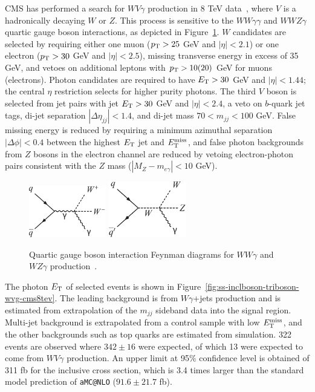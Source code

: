 CMS has performed a search for $WV\gamma$ production in 8 TeV
data~\cite{Chatrchyan:2014bza}, where $V$ is a hadronically decaying
$W$ or $Z$.  This process is sensitive to the $WW\gamma\gamma$ and
$WWZ\gamma$ quartic gauge boson interactions, as depicted in
Figure~\ref{fig:ss-inclboson-triboson-wvg-diagrams}.  $W$ candidates are
selected by requiring either one muon ($p_{\mathrm{T}} > 25$ GeV and
$|\eta|<2.1$) or one electron ($p_{\mathrm{T}} > 30$ GeV and $|\eta| < 2.5$),
missing transverse energy in excess of 35 GeV, and vetoes on
additional leptons with $p_{\mathrm{T}} > 10 (20)$ GeV for muons (electrons).
Photon candidates are required to have $E_{\mathrm{T}} > 30$ GeV and $|\eta| <
1.44$; the central $\eta$ restriction selects for higher purity
photons.  The third $V$ boson is selected from jet pairs with jet $E_{\mathrm{T}}
> 30$ GeV and $|\eta| < 2.4$, a veto on $b$-quark jet tags, di-jet
separation $|\Delta\eta_{jj}| < 1.4$, and di-jet mass $70 < m_{jj} <
100$ GeV.  False missing energy is reduced by requiring a minimum
azimuthal separation $|\Delta\phi| < 0.4$ between the highest $E_{\mathrm{T}}$
jet and $E_{\mathrm{T}}^{\mathrm{miss}}$, and false photon backgrounds from $Z$ bosons in the
electron channel are reduced by vetoing electron-photon pairs
consistent with the $Z$ mass ($|M_Z-m_{e\gamma}| < 10$ GeV).

\begin{figure}[p]
    \centering
    \includegraphics[width=0.3\textwidth]{figures/ss-inclboson-triboson-wvg-diagram1.pdf}
    \includegraphics[width=0.3\textwidth]{figures/ss-inclboson-triboson-wvg-diagram2.pdf}
    \caption{Quartic gauge boson interaction Feynman diagrams for $WW\gamma$ and $WZ\gamma$ production~\cite{Chatrchyan:2014bza}.}
    \label{fig:ss-inclboson-triboson-wvg-diagrams}
\end{figure}


The photon $E_{\mathrm{T}}$ of selected events is shown in
Figure~\ref{fig:ss-inclboson-triboson-wvg-cms8tev}.  The leading
background is from $W\gamma$+jets production and is estimated from
extrapolation of the $m_{jj}$ sideband data into the signal region.
Multi-jet background is extrapolated from a control sample with low
$E_{\mathrm{T}}^{\mathrm{miss}}$, and the other backgrounds such as top quarks are estimated
from simulation.  322 events are observed where $342\pm 16$ were
expected, of which 13 were expected to come from $WV\gamma$
production.  An upper limit at 95\% confidence level is obtained of
311 fb for the inclusive cross section, which is 3.4 times larger than
the standard model prediction of \texttt{aMC@NLO} ($91.6 \pm 21.7$ fb).

